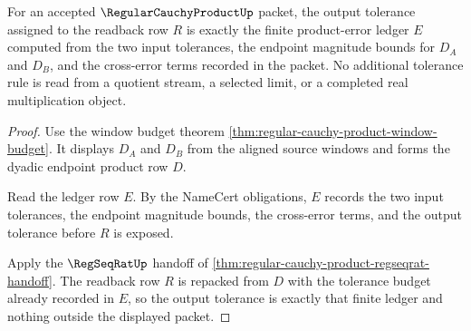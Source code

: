 \begin{theorem}
\label{thm:regular-cauchy-product-error-budget-exactness}
For an accepted $\RegularCauchyProductUp$ packet, the output tolerance assigned to the readback row $R$ is exactly the finite product-error ledger $E$ computed from the two input tolerances, the endpoint magnitude bounds for $D_A$ and $D_B$, and the cross-error terms recorded in the packet. No additional tolerance rule is read from a quotient stream, a selected limit, or a completed real multiplication object.
\end{theorem}
\begin{proof}
Use the window budget theorem \autoref{thm:regular-cauchy-product-window-budget}. It displays $D_A$ and $D_B$ from the aligned source windows and forms the dyadic endpoint product row $D$.

Read the ledger row $E$. By the NameCert obligations, $E$ records the two input tolerances, the endpoint magnitude bounds, the cross-error terms, and the output tolerance before $R$ is exposed.

Apply the $\RegSeqRatUp$ handoff of \autoref{thm:regular-cauchy-product-regseqrat-handoff}. The readback row $R$ is repacked from $D$ with the tolerance budget already recorded in $E$, so the output tolerance is exactly that finite ledger and nothing outside the displayed packet.
\end{proof}

